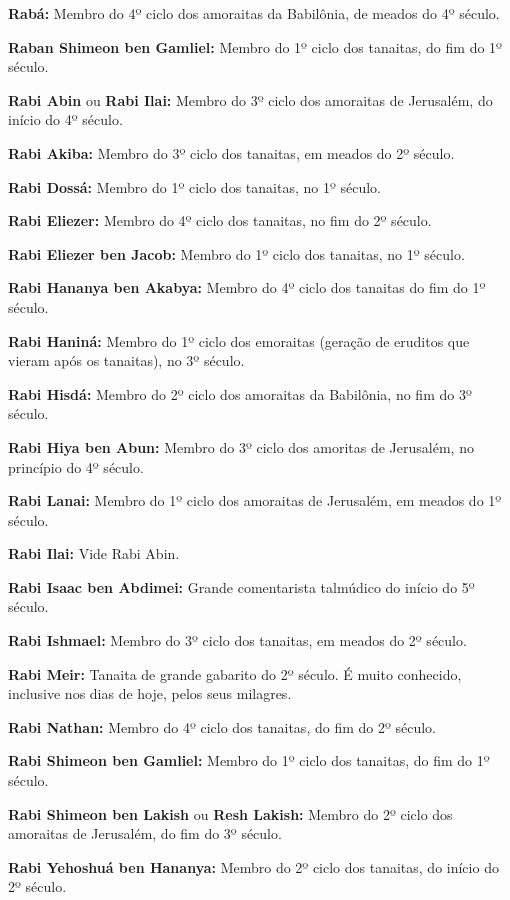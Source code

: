 \begin{hangparas}{.25in}{1}
{\textbf{Rabá:} Membro do 4º ciclo dos amoraitas da Babilônia, de
meados do 4º século.

\textbf{Raban Shimeon ben Gamliel:} Membro do 1º ciclo dos tanaitas,
do fim do 1º século.

\textbf{Rabi Abin} ou \textbf{Rabi Ilai:} Membro do
3º ciclo dos amoraitas de Jerusalém, do início do 4º século.

\textbf{Rabi Akiba:} Membro do 3º ciclo dos tanaitas, em meados do 2º
século.

\textbf{Rabi Dossá:} Membro do 1º ciclo dos tanaitas, no 1º século.

\textbf{Rabi Eliezer:} Membro do 4º ciclo dos tanaitas, no fim do 2º século.

\textbf{Rabi Eliezer ben Jacob:} Membro do 1º ciclo dos tanaitas, no 1º século.

\textbf{Rabi Hananya ben Akabya:} Membro do 4º ciclo dos tanaitas do fim do 1º século.

\textbf{Rabi Haniná:} Membro do 1º ciclo dos emoraitas (geração de eruditos que vieram após os tanaitas), no 3º século.

\textbf{Rabi Hisdá:} Membro do 2º ciclo dos amoraitas da Babilônia, no fim do 3º século.

\textbf{Rabi Hiya ben Abun:} Membro do 3º ciclo dos amoritas de
Jerusalém, no princípio do 4º século.

\textbf{Rabi Lanai:} Membro do 1º ciclo dos amoraitas de Jerusalém, em meados do 1º século.

\textbf{Rabi Ilai:} Vide Rabi Abin.

\textbf{Rabi Isaac ben Abdimei:} Grande comentarista talmúdico do
início do 5º século.

\textbf{Rabi Ishmael:} Membro do 3º ciclo dos tanaitas, em meados do 2º
século.

\textbf{Rabi Meir:} Tanaita de grande gabarito do 2º século. É muito
conhecido, inclusive nos dias de hoje, pelos seus milagres.

\textbf{Rabi Nathan:} Membro do 4º ciclo dos tanaitas, do fim do 2º
século.

\textbf{Rabi Shimeon ben Gamliel:} Membro do 1º ciclo dos
tanaitas, do fim do 1º século.

\textbf{Rabi Shimeon ben Lakish} ou \textbf{Resh Lakish:} Membro do 2º
ciclo dos amoraitas de Jerusalém, do fim do 3º século.

\textbf{Rabi Yehoshuá ben Hananya:} Membro do 2º ciclo dos tanaitas, do
início do 2º século.

}
\end{hangparas}
